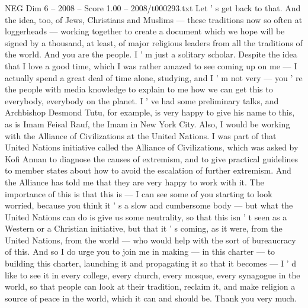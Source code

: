 \begin{textsample}{NEG Dim 6 – 2008 – Score 1.00 – 2008/t000293.txt}
Let ' s get back to that.
And the idea, too, of Jews, Christians and Muslims — these traditions now so often at loggerheads — working together to create a document which we hope will be signed by a thousand, at least, of major religious leaders from all the traditions of the world.
And you are the people.
I ' m just a solitary scholar.
Despite the idea that I love a good time, which I was rather amazed to see coming up on me — I actually spend a great deal of time alone, studying, and I ' m not very — you ' re the people with media knowledge to explain to me how we can get this to everybody, everybody on the planet.
I ' ve had some preliminary talks, and Archbishop Desmond Tutu, for example, is very happy to give his name to this, as is Imam Feisal Rauf, the Imam in New York City.
Also, I would be working with the Alliance of Civilizations at the United Nations.
I was part of that United Nations initiative called the Alliance of Civilizations, which was asked by Kofi Annan to diagnose the causes of extremism, and to give practical guidelines to member states about how to avoid the escalation of further extremism.
And the Alliance has told me that they are very happy to work with it.
The importance of this is that this is — I can see some of you starting to look worried, because you think it ' s a slow and cumbersome body — but what the United Nations can do is give us some neutrality, so that this isn ' t seen as a Western or a Christian initiative, but that it ' s coming, as it were, from the United Nations, from the world — who would help with the sort of bureaucracy of this.
And so I do urge you to join me in making — in this charter — to building this charter, launching it and propagating it so that it becomes — I ' d like to see it in every college, every church, every mosque, every synagogue in the world, so that people can look at their tradition, reclaim it, and make religion a source of peace in the world, which it can and should be.
Thank you very much.

\end{textsample}
